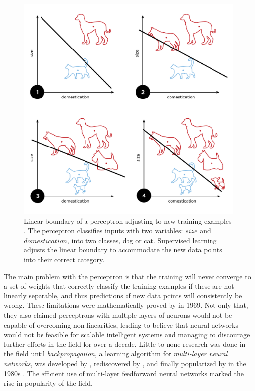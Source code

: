 \begin{figure}[t]
  \includegraphics[width=\textwidth]{gfx/perceptron-training}
  \caption{
    Linear boundary of a perceptron adjusting to new training examples \cite{Goodspeed2015}.
    The perceptron classifies inputs with two variables: $size$ and $domestication$, into two classes, dog or cat.
    Supervised learning adjusts the linear boundary to accommodate the new data points into their correct category.
  }
  \label{fig:sec:theory:perceptron-training}
\end{figure}

The main problem with the perceptron is that the training will never converge to a set of weights that correctly classify the training examples if these are not linearly separable, and thus predictions of new data points will consistently be wrong.
These limitations were mathematically proved by \citet{Minsky1969} in 1969.
Not only that, they also claimed perceptrons with multiple layers of neurons would not be capable of overcoming non-linearities, leading to believe that neural networks would not be feasible for scalable intelligent systems and managing to discourage further efforts in the field for over a decade.
Little to none research was done in the field until \emph{backpropagation}, a learning algorithm for \emph{multi-layer neural networks}, was developed by \citet{Werbos1974}, rediscovered by \citet{Parker1985}, and finally popularized by \citet{Rumelhart1986} in the 1980s \cite{Ruck1990}.
The efficient use of multi-layer feedforward neural networks marked the rise in popularity of the field.


